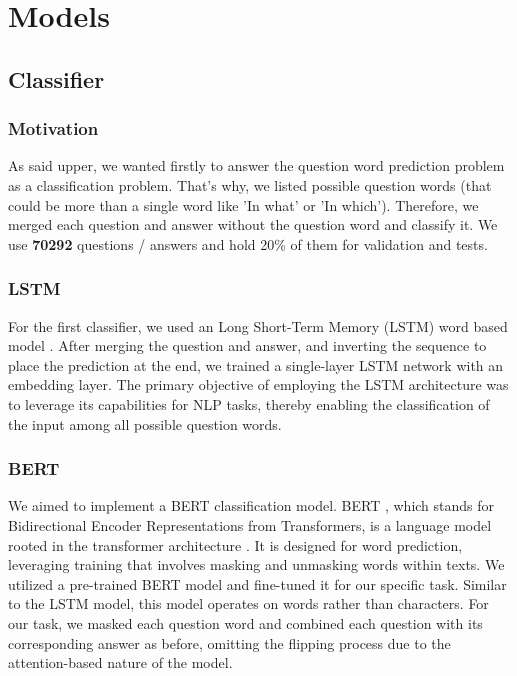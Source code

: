 \documentclass{article}
\begin{document}
\section{Models}

\subsection{Classifier}

\subsubsection{Motivation}

As said upper, we wanted firstly to answer the question word prediction problem as a classification problem. That's why, we listed possible question words (that could be more than a single word like 'In what' or 'In which'). Therefore, we merged each question and answer without the question word and classify it. We use \textbf{70292} questions / answers and hold 20\% of them for validation and tests.

\subsubsection{LSTM}

For the first classifier, we used an Long Short-Term Memory (LSTM) word based model \cite{lstm1997}. After merging the question and answer, and inverting the sequence to place the prediction at the end, we trained a single-layer LSTM network with an embedding layer. The primary objective of employing the LSTM architecture was to leverage its capabilities for NLP tasks, thereby enabling the classification of the input among all possible question words.

\subsubsection{BERT}

We aimed to implement a BERT classification model. BERT \cite{devlin2019bert}, which stands for Bidirectional Encoder Representations from Transformers, is a language model rooted in the transformer architecture \cite{vaswani2017attention}. It is designed for word prediction, leveraging training that involves masking and unmasking words within texts. We utilized a pre-trained BERT model and fine-tuned it for our specific task. Similar to the LSTM model, this model operates on words rather than characters. For our task, we masked each question word and combined each question with its corresponding answer as before, omitting the flipping process due to the attention-based nature of the model.
\end{document}

